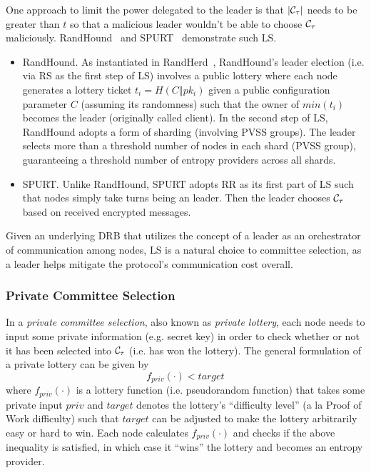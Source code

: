 One approach to limit the power delegated to the leader is that $|\mathcal{C}_\tau|$ needs to be greater than $t$ so that a malicious leader wouldn't be able to choose $\mathcal{C}_\tau$ maliciously. RandHound~\cite{syta2017scalable} and SPURT~\cite{das2021spurt} demonstrate such LS.
\begin{itemize}
\item RandHound. As instantiated in RandHerd~\cite{syta2017scalable}, RandHound's leader election (i.e. via RS as the first step of LS) involves a public lottery where each node generates a lottery ticket $t_i = H(C \mathbin\Vert pk_i)$ given a public configuration parameter $C$ (assuming its randomness) such that the owner of $min(t_i)$ becomes the leader (originally called client). In the second step of LS, RandHound adopts a form of sharding (involving PVSS groups). The leader selects more than a threshold number of nodes in each shard (PVSS group), guaranteeing a threshold number of entropy providers across all shards.
\item SPURT. Unlike RandHound, SPURT adopts RR as its first part of LS such that nodes simply take turns being an \epoch leader. Then the leader chooses $\mathcal{C}_\tau$ based on received encrypted messages.
\end{itemize}

Given an underlying DRB that utilizes the concept of a leader as an orchestrator of communication among nodes, LS is a natural choice to committee selection, as a leader helps mitigate the protocol's communication cost overall.

\subsubsection{Private Committee Selection}
\label{subsubsection:private-committee-selection}
In a \textit{private committee selection}, also known as \textit{private lottery}, each node needs to input some private information (e.g. secret key) in order to check whether or not it has been selected into $\mathcal{C}_\tau$ (i.e. has won the lottery). The general formulation of a private lottery can be given by
\[
f_{priv}(\cdot) < target
\]
where $f_{priv}(\cdot)$ is a lottery function (i.e. pseudorandom function) that takes some private input $priv$ and $target$ denotes the lottery's ``difficulty level'' (a la Proof of Work difficulty) such that $target$ can be adjusted to make the lottery arbitrarily easy or hard to win. Each node calculates $f_{priv}(\cdot)$ and checks if the above inequality is satisfied, in which case it ``wins'' the lottery and becomes an entropy provider.

